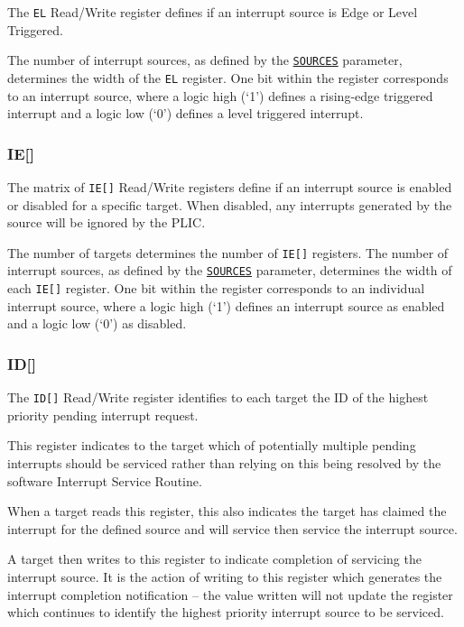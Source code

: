 The \texttt{EL} Read/Write register defines if an interrupt source is
Edge or Level Triggered.

The number of interrupt sources, as defined by the
\protect\hyperlink{SOURCES}{\texttt{SOURCES}} parameter, determines
the width of the \texttt{EL} register. One bit within the register
corresponds to an interrupt source, where a logic high (`1') defines a
rising-edge triggered interrupt and a logic low (`0') defines a level
triggered interrupt.

\subsubsection{IE[]}

The matrix of \texttt{IE[]} Read/Write registers define if an
interrupt source is enabled or disabled for a specific target. When
disabled, any interrupts generated by the source will be ignored by the
PLIC.

The number of targets determines the number of \texttt{IE[]}
registers. The number of interrupt sources, as defined by the
\protect\hyperlink{SOURCES}{\texttt{SOURCES}} parameter, determines the
width of each \texttt{IE[]} register. One bit within the register
corresponds to an individual interrupt source, where a logic high (`1')
defines an interrupt source as enabled and a logic low (`0') as
disabled.

\subsubsection{ID[]}

The \texttt{ID[]} Read/Write register identifies to each target
the ID of the highest priority pending interrupt request.

This register indicates to the target which of potentially multiple
pending interrupts should be serviced rather than relying on this being
resolved by the software Interrupt Service Routine.

When a target reads this register, this also indicates the target has
claimed the interrupt for the defined source and will service then
service the interrupt source.

A target then writes to this register to indicate completion of
servicing the interrupt source. It is the action of writing to this
register which generates the interrupt completion notification -- the
value written will not update the register which continues to identify
the highest priority interrupt source to be serviced.

